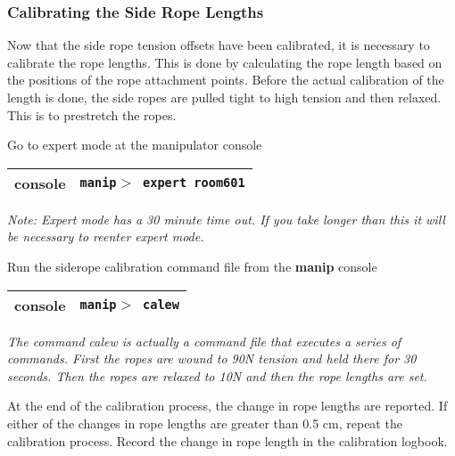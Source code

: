\subsubsection{Calibrating the Side Rope Lengths}
  Now that the side rope tension offsets have been
calibrated, it is necessary to calibrate the rope
lengths.  This is done by calculating the rope length
based on the positions of the rope attachment points.
Before the actual calibration of the length is done,
the side ropes are pulled tight to high tension and
then relaxed.  This is to prestretch the ropes.
 
\begin{enumerate}

\checkitem Go to expert mode at the manipulator console

  \begin{center}
  \begin{tabular}{|l|l|}
  \hline
  console & {\tt manip$>$ expert room601} \\
  \hline
  \end{tabular}
  \end{center}
  {\small\em Note: Expert mode has a 30 minute time out.  If 
   you take longer than this it will be necessary to reenter expert mode.}

\checkitem Run the siderope calibration command file from the 
  {\bf manip} console  
  \begin{center}
  \begin{tabular}{|l|l|}
  \hline
  console & {\tt manip$>$ calew} \\
  \hline
  \end{tabular}
  \end{center}
  \small
  {\em
    The command calew is actually a command file that executes
    a series of commands.  First the ropes are wound to 90N tension
    and held there for 30 seconds.  Then the ropes are relaxed to
    10N and then the rope lengths are set.
  }
  \normalsize

\checkitem At the end of the calibration process, the change in rope lengths
  are reported.  If either of the changes in rope lengths are greater
  than 0.5 cm, repeat the calibration process. Record the change in rope length
in the calibration logbook.


\end{enumerate}

